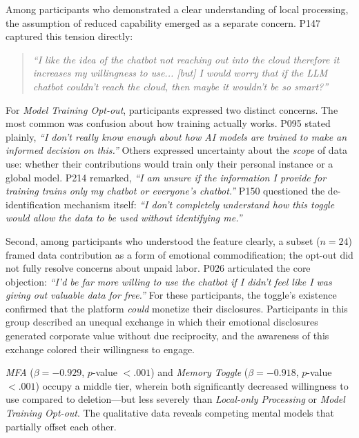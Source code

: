 \documentclass[letterpaper,twocolumn,10pt]{article}
\begin{document}
Among participants who demonstrated a clear understanding of local processing, the assumption of reduced capability emerged as a separate concern. P147 captured this tension directly:

\begin{quote}
\textit{``I like the idea of the chatbot not reaching out into the cloud therefore it increases my willingness to use... [but] I would worry that if the LLM chatbot couldn't reach the cloud, then maybe it wouldn't be so smart?''}
\end{quote}

For \emph{Model Training Opt-out}, participants expressed two distinct concerns. The most common was confusion about how training actually works. P095 stated plainly, \textit{``I don't really know enough about how AI models are trained to make an informed decision on this.''} Others expressed uncertainty about the \textit{scope} of data use: whether their contributions would train only their personal instance or a global model. P214 remarked, \textit{``I am unsure if the information I provide for training trains only my chatbot or everyone's chatbot.''} P150 questioned the de-identification mechanism itself: \textit{``I don't completely understand how this toggle would allow the data to be used without identifying me.''}

Second, among participants who understood the feature clearly, a subset ($n=24$) framed data contribution as a form of emotional commodification; the opt-out did not fully resolve concerns about unpaid labor. P026 articulated the core objection: \textit{``I'd be far more willing to use the chatbot if I didn't feel like I was giving out valuable data for free.''} For these participants, the toggle's existence confirmed that the platform \textit{could} monetize their disclosures. Participants in this group described an unequal exchange in which their emotional disclosures generated corporate value without due reciprocity, and the awareness of this exchange colored their willingness to engage.

 \emph{MFA} ($\beta = -0.929$, $p$-value $< .001$) and \emph{Memory Toggle} ($\beta = -0.918$, $p$-value $< .001$) occupy a middle tier, wherein both significantly decreased willingness to use compared to deletion---but less severely than \emph{Local-only Processing} or \emph{Model Training Opt-out}. The qualitative data reveals competing mental models that partially offset each other.
\end{document}
